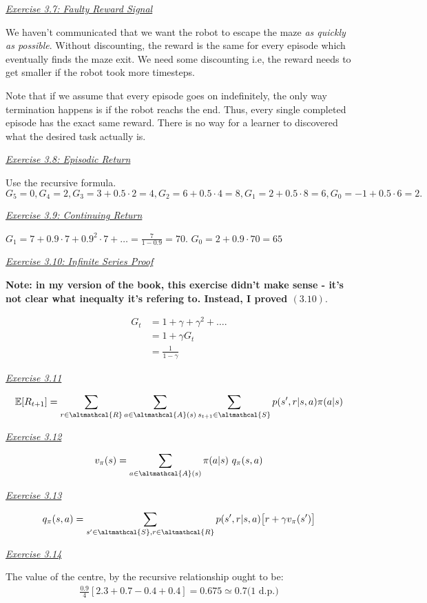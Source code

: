 \documentclass{article}
\newcommand{\myq}[1]{%
	\vspace{1em}
	\noindent\underline{\emph{Exercise #1}}\vspace{0.25em}\linebreak
}
\begin{document}
\myq{3.7: Faulty Reward Signal}
We haven't communicated that we want the robot to escape the maze \emph{as quickly as possible}. Without discounting, the reward is the same for every episode which eventually finds the maze exit. We need some discounting i.e, the reward needs to get smaller if the robot took more timesteps. 

Note that if we assume that every episode goes on indefinitely, the only way termination happens is if the robot reachs the end. Thus, every single completed episode has the exact same reward. There is no way for a learner to discovered what the desired task actually is. 

\myq{3.8: Episodic Return}
Use the recursive formula. $G_5 = 0, G_4 = 2, G_3 = 3 + 0.5 \cdot 2 = 4, G_2 = 6 + 0.5\cdot4 = 8, G_1 = 2 + 0.5\cdot8 = 6, G_0 = -1 + 0.5\cdot 6 = 2.$ 

\myq{3.9: Continuing Return}
$G_1 = 7 + 0.9\cdot7 + 0.9^2\cdot 7 + \dots = \frac{7}{1-0.9}=70$. 
$G_0 = 2 + 0.9 \cdot 70 = 65$

\myq{3.10: Infinite Series Proof}
\textbf{Note: in my version of the book, this exercise didn't make sense - it's not clear what inequalty it's refering to. Instead, I proved $(3.10)$}.

\begin{align}
G_t &= 1 + \gamma + \gamma^2 + \dots. \nonumber \\
 &= 1 + \gamma G_t \nonumber \\
 &= \frac{1}{1 - \gamma} 
\end{align}

\myq{3.11}
\begin{align}
\mathbb{E}[R_{t+1}]=  \sum_{r \in \altmathcal{R}} \sum_{a \in \altmathcal{A}(s)} \sum_{s_{t+1} \in \altmathcal{S}} p(s', r | s, a) \pi(a | s)
\end{align}

\myq{3.12}
\begin{align}
v_\pi(s) = \sum_{a \in \altmathcal{A}(s)} \pi(a|s)\ q_\pi(s, a)
\end{align}

\myq{3.13}
\begin{align}
q_\pi(s, a) = \sum_{s' \in \altmathcal{S}, r \in \altmathcal{R}} p(s', r | s, a) \big[ r + \gamma v_\pi(s') \big]
\end{align}

\myq{3.14}
The value of the centre, by the recursive relationship ought to be:
\begin{align}
\frac{0.9}{4} [2.3 + 0.7 -0.4 + 0.4] = 0.675 \simeq 0.7 \text{(1 d.p.)}
\end{align}
\end{document}
